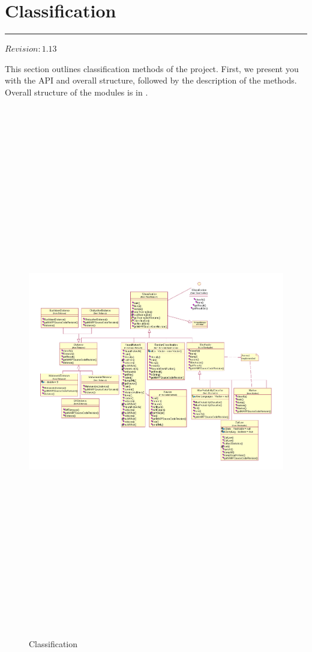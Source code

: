 \section{Classification}

\noindent
\rule{7.0in}{.013in}

$Revision: 1.13 $

This section outlines classification methods of the {\marf} project.
First, we present you with the API and overall structure, followed
by the description of the methods. Overall structure of the modules
is in .

\begin{figure}
	\centering
	\includegraphics[angle=90,height=660pt]{../graphics/arch/classification.png}
	\caption{Classification}
	\label{fig:classification}
\end{figure}
















